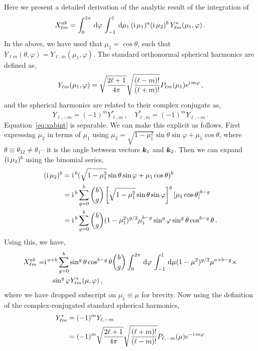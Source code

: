 Here we present a detailed derivation of the analytic result of the integration of
\begin{equation} \label{eq:xabint}
X_{\ell m}^{ab} = \int_0^{2\pi} \,\mathrm{d}\varphi\, \int_{-1}^1 \,\mathrm{d}\mu_1\, (\mathrm{i\,} \mu_1)^a (\mathrm{i\,} \mu_2)^b \,Y_{\ell m}^*(\mu_1,\varphi)\,.
\end{equation}
In the above, we have used that $\mu_1 = \cos \theta$, such that $Y_{\ell m} (\theta, \varphi) = Y_{\ell,m}(\mu_1,\varphi)$. 
The standard orthonormal spherical harmonics are defined as, 
\begin{equation}
	Y_{\ell m}(\mu_1, \varphi) = \sqrt{\frac{2\ell+1}{4\pi}} \sqrt{\frac{(\ell - m)!}{(\ell + m)!}} P_{\ell m}(\mu_1) e^{\mathrm{i\,} m \varphi}\,,
\end{equation}
and the spherical harmonics are related to their complex conjugate as, 
\begin{equation}
	Y_{\ell,-m} = (-1)^m Y^*_{\ell,m}\,,\quad Y^*_{\ell,m} = (-1)^m Y_{\ell,-m}\,.
\end{equation}
Equation~\eqref{eq:xabint} is separable. We can make this explicit as follows. First expressing $\mu_2$ in terms of $\mu_1$ using $\mu_2 = \sqrt{1 - \mu_1^2} \sin\theta \sin\varphi + \mu_1 \cos\theta$, where $\theta \equiv \theta_{12} \neq \theta_1$-- it is the angle between vectors $\bm {k}_1$ and $\bm {k}_2$. Then we can expand $(\mathrm{i\,}\mu_2)^b$ using the binomial series, 
\begin{align}
	(\mathrm{i\,} \mu_2)^b &= \mathrm{i\,}^b ( \sqrt{1 - \mu_1^2} \sin\theta \sin\varphi + \mu_1 \cos\theta)^b \nonumber \\ 
	&= \mathrm{i\,}^b \sum_{g=0}^b \binom{b}{g} \left[ \sqrt{1 - \mu_1^2} \sin\theta \sin\varphi \right]^g \left[ \mu_1 \cos\theta \right]^{b-g}\nonumber \\
	&= \mathrm{i\,}^b \sum_{g=0}^b \binom{b}{g} (1 - \mu_1^2)^{g/2} \mu_1^{b-g} \sin^g\varphi \sin^g\theta \cos^{b-g}\theta\,.
\end{align}
Using this, we have,
\begin{align}
	X_{\ell m}^{ab} =& \mathrm{i\,}^{a+b} \sum_{g=0}^b \sin^g\theta \cos^{b-g}\theta \binom{b}{g} \int_0^{2\pi}\,\mathrm{d}\varphi\, \int_{-1}^1\,\mathrm{d}\mu (1-\mu^2)^{g/2} \mu^{a+b-g} \times \nonumber \\
	&\quad \sin^g\varphi Y^*_{\ell m}(\mu,\varphi)\,,
\end{align}
where we have dropped subscript on $\mu_1 \equiv \mu$ for brevity. Now using the definition of the complex-conjugated standard spherical harmonics, 
\begin{align}
	Y^*_{\ell m} &= (-1)^m Y_{\ell,-m} \nonumber \\
	&= (-1)^m \sqrt{\frac{2\ell + 1}{4 \pi}} \sqrt{\frac{(\ell +m)!}{(\ell - m)!}} P_{\ell,-m}(\mu) e^{-\mathrm{i\,} m \varphi} \,
\end{align}
